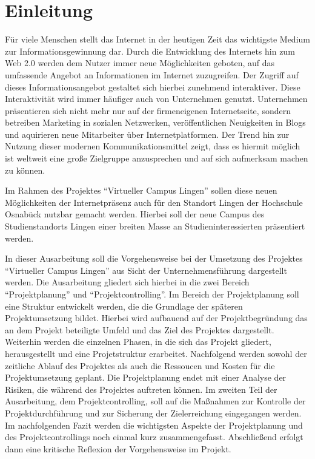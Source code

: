 \section{Einleitung}
\label{sec:Einleitung}
Für viele Menschen stellt das Internet in der heutigen Zeit das wichtigste
Medium zur Informationsgewinnung dar. Durch die Entwicklung des Internets hin
zum Web 2.0 werden dem Nutzer immer neue Möglichkeiten geboten, auf das
umfassende Angebot an Informationen im Internet zuzugreifen. Der Zugriff auf
dieses Informationsangebot gestaltet sich hierbei zunehmend interaktiver.
Diese Interaktivität wird immer häufiger auch von Unternehmen genutzt.
Unternehmen präsentieren sich nicht mehr nur auf der firmeneigenen
Internetseite, sondern betreiben Marketing in sozialen Netzwerken,
veröffentlichen Neuigkeiten in Blogs und aquirieren neue Mitarbeiter über
Internetplatformen. Der Trend hin zur Nutzung dieser modernen
Kommunikationsmittel zeigt, dass es hiermit möglich ist weltweit eine große
Zielgruppe anzusprechen und auf sich aufmerksam machen zu können.

Im Rahmen des Projektes "`Virtueller Campus Lingen"' sollen diese neuen
Möglichkeiten der Internetpräsenz auch für den Standort Lingen der Hochschule
Osnabück nutzbar gemacht werden. Hierbei soll der neue Campus des
Studienstandorts Lingen einer breiten Masse an Studieninteressierten
präsentiert werden.

In dieser Ausarbeitung soll die Vorgehensweise bei der Umsetzung des Projektes
"`Virtueller Campus Lingen"' aus Sicht der Unternehmensführung dargestellt
werden. Die Ausarbeitung gliedert sich hierbei in die zwei Bereich
"`Projektplanung"' und "`Projektcontrolling"'. Im Bereich der Projektplanung
soll eine Struktur entwickelt werden, die die Grundlage der späteren
Projektumsetzung bildet. Hierbei wird aufbauend auf der Projektbegründung das an
dem Projekt beteiligte Umfeld und das Ziel des Projektes dargestellt. Weiterhin
werden die einzelnen Phasen, in die sich das Projekt gliedert, herausgestellt
und eine Projetstruktur erarbeitet. Nachfolgend werden sowohl der zeitliche
Ablauf des Projektes als auch die Ressoucen und Kosten für die Projektumsetzung
geplant. Die Projektplanung endet mit einer Analyse der Risiken, die während des
Projektes auftreten können. Im zweiten Teil der Ausarbeitung, dem
Projektcontrolling, soll auf die Maßnahmen zur Kontrolle der Projektdurchführung
und zur Sicherung der Zielerreichung eingegangen werden. Im nachfolgenden
Fazit werden die wichtigsten Aspekte der Projektplanung und des
Projektcontrollings noch einmal kurz zusammengefasst. Abschließend erfolgt
dann eine kritische Reflexion der Vorgehensweise im Projekt.